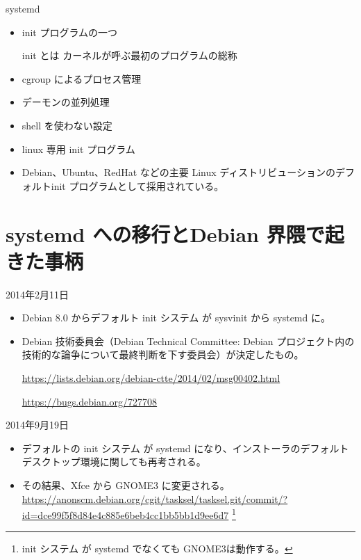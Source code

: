 \begin{frame}{systemd}
\begin{itemize}
\item init プログラムの一つ

      init とは カーネルが呼ぶ最初のプログラムの総称

\item cgroup によるプロセス管理
\item デーモンの並列処理
\item shell を使わない設定
\item linux 専用 init プログラム
\item Debian、Ubuntu、RedHat などの主要 Linux ディストリビューションのデフォルトinit プログラムとして採用されている。
\end{itemize}
\end{frame}

\section{systemd への移行とDebian 界隈で起きた事柄}

\begin{frame}{2014年2月11日}

\begin{itemize}
\item Debian 8.0 からデフォルト init システム が sysvinit から systemd に。
\item Debian 技術委員会（Debian Technical Committee: Debian プロジェクト内の技術的な論争について最終判断を下す委員会）が決定したもの。

\url{https://lists.debian.org/debian-ctte/2014/02/msg00402.html}

\url{https://bugs.debian.org/727708}

\end{itemize}

\end{frame}



\begin{frame}{2014年9月19日}

\begin{itemize}
\item デフォルトの init システム が systemd になり、インストーラのデフォルト デスクトップ環境に関しても再考される。
\item その結果、Xfce から GNOME3 に変更される。
      \url{https://anonscm.debian.org/cgit/tasksel/tasksel.git/commit/?id=dce99f5f8d84e4c885e6beb4cc1bb5bb1d9ee6d7}
      \footnote{init システム が systemd でなくても GNOME3は動作する。}

\end{itemize}

\end{frame}

